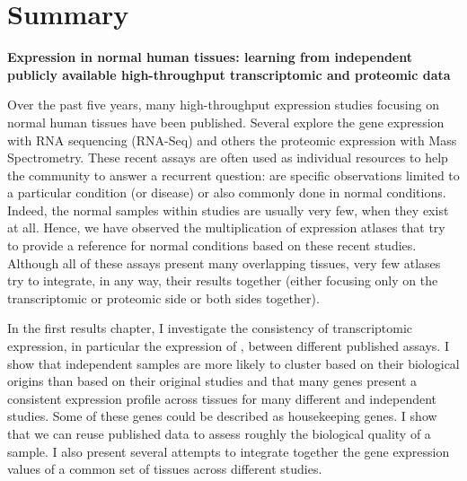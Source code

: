 \clearpage
\chapter*{Summary}
\label{ch:summary}

\begin{singlespace}

%

    \textbf{Expression in normal human tissues: learning from
    independent publicly available high-throughput transcriptomic and proteomic
    data}

       \small{Over the past five years, many high-throughput expression studies
        focusing on normal human tissues have been published. Several explore
        the gene expression with \gls{RNA} sequencing (\gls{RNA-Seq}) and others
        the proteomic expression with Mass Spectrometry. These recent assays are
        often used as individual resources to help the community to answer a
        recurrent question: are specific observations limited to a particular
        condition (or disease) or also commonly done in normal conditions.
        Indeed, the normal samples within studies are usually very few, when they
        exist at all. Hence, we have observed the multiplication of expression
        atlases that try to provide a reference for normal conditions based on
        these recent studies. Although all of these assays
        present many overlapping tissues, very few atlases try to integrate,
        in any way, their results together (either focusing only on the
        transcriptomic or proteomic side or both sides together).

        In the first results chapter, I investigate the consistency of
        transcriptomic expression, in particular the expression of \mRNAs,
        between different published assays. I show that independent samples are
        more likely to cluster based on their biological origins than based on
        their original studies and that many genes present a consistent expression
        profile across tissues for many different and independent studies. Some
        of these genes could be described as housekeeping genes. I show that we
        can reuse published data to assess roughly the biological quality of a
        sample. I also present several attempts to integrate together the gene
        expression values of a common set of tissues across different studies.

}
\end{singlespace}
